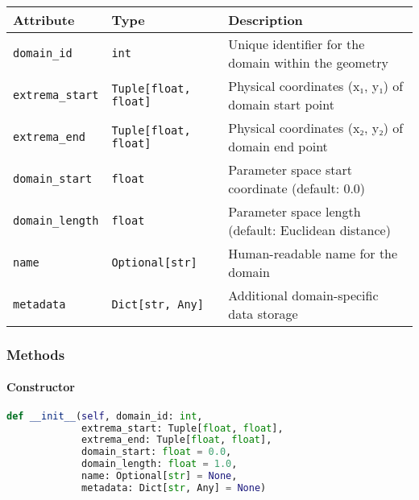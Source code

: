 \begin{longtable}{|p{3cm}|p{3.5cm}|p{6cm}|}
\hline
\textbf{Attribute} & \textbf{Type} & \textbf{Description} \\
\hline
\endhead

\texttt{domain\_id} & \texttt{int} & Unique identifier for the domain within the geometry \\
\hline

\texttt{extrema\_start} & \texttt{Tuple[float, float]} & Physical coordinates (x₁, y₁) of domain start point \\
\hline

\texttt{extrema\_end} & \texttt{Tuple[float, float]} & Physical coordinates (x₂, y₂) of domain end point \\
\hline

\texttt{domain\_start} & \texttt{float} & Parameter space start coordinate (default: 0.0) \\
\hline

\texttt{domain\_length} & \texttt{float} & Parameter space length (default: Euclidean distance) \\
\hline

\texttt{name} & \texttt{Optional[str]} & Human-readable name for the domain \\
\hline

\texttt{metadata} & \texttt{Dict[str, Any]} & Additional domain-specific data storage \\
\hline

\end{longtable}

\subsubsection{Methods}

\paragraph{Constructor}
\begin{lstlisting}[language=Python, caption=DomainInfo Constructor]
def __init__(self, domain_id: int, 
             extrema_start: Tuple[float, float],
             extrema_end: Tuple[float, float],
             domain_start: float = 0.0,
             domain_length: float = 1.0,
             name: Optional[str] = None,
             metadata: Dict[str, Any] = None)
\end{lstlisting}

